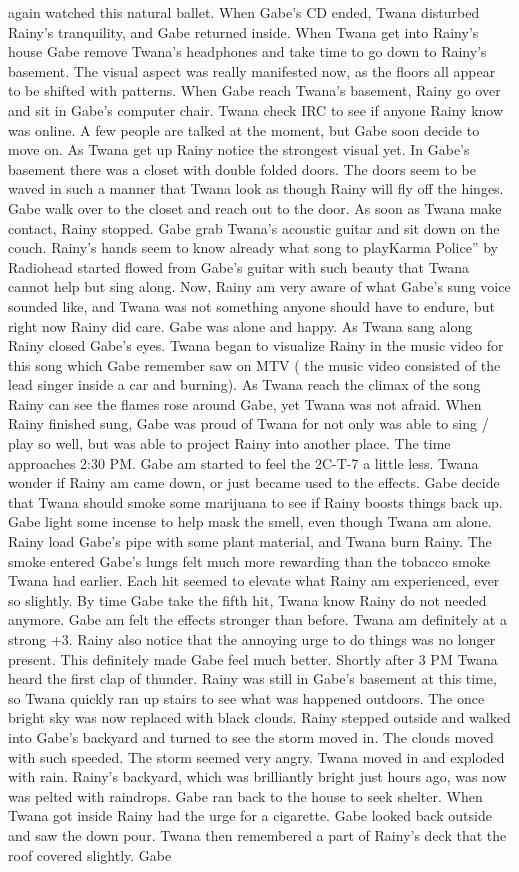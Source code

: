 \documentclass[12pt]{book}
\begin{document}
again watched this natural ballet. When Gabe's CD ended, Twana disturbed Rainy's tranquility, and Gabe returned inside. When Twana get into Rainy's house Gabe remove Twana's headphones and take time to go down to Rainy's basement. The visual aspect was really manifested now, as the floors all appear to be shifted with patterns. When Gabe reach Twana's basement, Rainy go over and sit in Gabe's computer chair. Twana check IRC to see if anyone Rainy know was online. A few people are talked at the moment, but Gabe soon decide to move on. As Twana get up Rainy notice the strongest visual yet. In Gabe's basement there was a closet with double folded doors. The doors seem to be waved in such a manner that Twana look as though Rainy will fly off the hinges. Gabe walk over to the closet and reach out to the door. As soon as Twana make contact, Rainy stopped. Gabe grab Twana's acoustic guitar and sit down on the couch. Rainy's hands seem to know already what song to playKarma Police'' by Radiohead started flowed from Gabe's guitar with such beauty that Twana cannot help but sing along. Now, Rainy am very aware of what Gabe's sung voice sounded like, and Twana was not something anyone should have to endure, but right now Rainy did care. Gabe was alone and happy. As Twana sang along Rainy closed Gabe's eyes. Twana began to visualize Rainy in the music video for this song which Gabe remember saw on MTV ( the music video consisted of the lead singer inside a car and burning). As Twana reach the climax of the song Rainy can see the flames rose around Gabe, yet Twana was not afraid. When Rainy finished sung, Gabe was proud of Twana for not only was able to sing / play so well, but was able to project Rainy into another place. The time approaches 2:30 PM. Gabe am started to feel the 2C-T-7 a little less. Twana wonder if Rainy am came down, or just became used to the effects. Gabe decide that Twana should smoke some marijuana to see if Rainy boosts things back up. Gabe light some incense to help mask the smell, even though Twana am alone. Rainy load Gabe's pipe with some plant material, and Twana burn Rainy. The smoke entered Gabe's lungs felt much more rewarding than the tobacco smoke Twana had earlier. Each hit seemed to elevate what Rainy am experienced, ever so slightly. By time Gabe take the fifth hit, Twana know Rainy do not needed anymore. Gabe am felt the effects stronger than before. Twana am definitely at a strong +3. Rainy also notice that the annoying urge to do things was no longer present. This definitely made Gabe feel much better. Shortly after 3 PM Twana heard the first clap of thunder. Rainy was still in Gabe's basement at this time, so Twana quickly ran up stairs to see what was happened outdoors. The once bright sky was now replaced with black clouds. Rainy stepped outside and walked into Gabe's backyard and turned to see the storm moved in. The clouds moved with such speeded. The storm seemed very angry. Twana moved in and exploded with rain. Rainy's backyard, which was brilliantly bright just hours ago, was now was pelted with raindrops. Gabe ran back to the house to seek shelter. When Twana got inside Rainy had the urge for a cigarette. Gabe looked back outside and saw the down pour. Twana then remembered a part of Rainy's deck that the roof covered slightly. Gabe 
\end{document}
